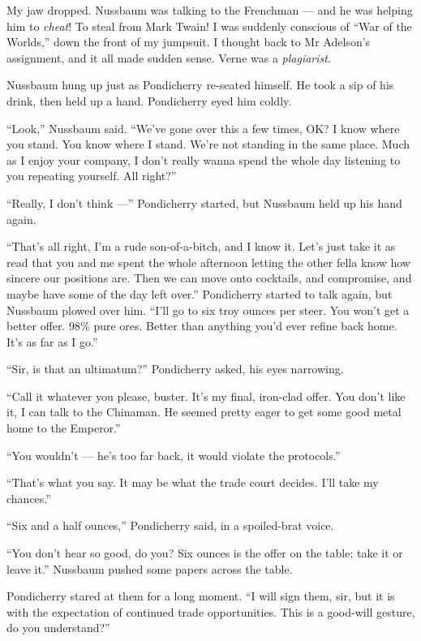 My jaw dropped. Nussbaum was talking to the Frenchman --- and he
was helping him to \emph{cheat}! To steal from Mark Twain! I was
suddenly conscious of ``War of the Worlds,'' down the front of my
jumpsuit. I thought back to Mr Adelson's assignment, and it all
made sudden sense. Verne was a \emph{plagiarist}.

Nussbaum hung up just as Pondicherry re-seated himself. He took a
sip of his drink, then held up a hand. Pondicherry eyed him
coldly.

``Look,'' Nussbaum said.
``We've gone over this a few times, OK? I know where you stand. You know where 
I stand. We're not standing in the same place. Much as I enjoy your company, I 
don't really wanna spend the whole day listening to you repeating yourself. All 
right?''

``Really, I don't think ---'' Pondicherry started, but Nussbaum
held up his hand again.

``That's all right, I'm a rude son-of-a-bitch, and I know it. Let's just take 
it as read that you and me spent the whole afternoon letting the other fella 
know how sincere our positions are. Then we can move onto cocktails, and 
compromise, and maybe have some of the day left over.''
Pondicherry started to talk again, but Nussbaum plowed over him.
``I'll go to six troy ounces per steer. You won't get a better offer. 98\% pure 
ores. Better than anything you'd ever refine back home. It's as far as I go.''

``Sir, is that an ultimatum?'' Pondicherry asked, his eyes
narrowing.

``Call it whatever you please, buster. It's my final, iron-clad offer. You 
don't like it, I can talk to the Chinaman. He seemed pretty eager to get some 
good metal home to the Emperor.''

``You wouldn't --- he's too far back, it would violate the protocols.''

``That's what you say. It may be what the trade court decides. I'll take my 
chances.''

``Six and a half ounces,'' Pondicherry said, in a spoiled-brat
voice.

``You don't hear so good, do you? Six ounces is the offer on the table; take it 
or leave it.''
Nussbaum pushed some papers across the table.

Pondicherry stared at them for a long moment.
``I will sign them, sir, but it is with the expectation of continued trade 
opportunities. This is a good-will gesture, do you understand?''

